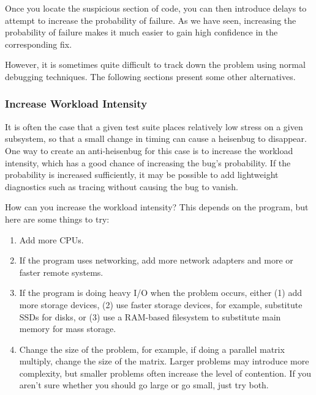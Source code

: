 \QuickQuizEnd

Once you locate the suspicious section of code, you can then introduce
delays to attempt to increase the probability of failure.
As we have seen, increasing the probability of failure makes it much
easier to gain high confidence in the corresponding fix.

However, it is sometimes quite difficult to track down the problem using
normal debugging techniques.
The following sections present some other alternatives.

\subsubsection{Increase Workload Intensity}
\label{sec:debugging:Increase Workload Intensity}

It is often the case that a given test suite places relatively
low stress on a given subsystem, so that a small change in timing
can cause a heisenbug to disappear.
One way to create an anti-heisenbug for this case is to increase
the workload intensity, which has a good chance of increasing the
bug's probability.
If the probability is increased sufficiently, it may be possible to
add lightweight diagnostics such as tracing without causing the
bug to vanish.

How can you increase the workload intensity?
This depends on the program, but here are some things to try:

\begin{enumerate}
\item	Add more CPUs.
\item	If the program uses networking, add more network adapters
	and more or faster remote systems.
\item	If the program is doing heavy I/O when the problem occurs,
	either (1) add more storage devices, (2) use faster storage
	devices, for example, substitute SSDs for disks,
	or (3) use a RAM-based filesystem to substitute main
	memory for mass storage.
\item	Change the size of the problem, for example, if doing a parallel
	matrix multiply, change the size of the matrix.
	Larger problems may introduce more complexity, but smaller
	problems often increase the level of contention.
	If you aren't sure whether you should go large or go small,
	just try both.
\end{enumerate}

